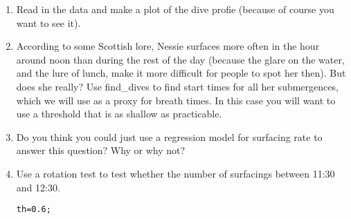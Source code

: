 \documentclass[12pt]{article}\usepackage[]{graphicx}\usepackage[]{color}
\makeatletter
\newcommand{\hlnum}[1]{\textcolor[rgb]{0.686,0.059,0.569}{#1}}%
\newcommand{\hlstd}[1]{\textcolor[rgb]{0.345,0.345,0.345}{#1}}%
\newcommand{\hlkwb}[1]{\textcolor[rgb]{0.69,0.353,0.396}{#1}}%
\newenvironment{kframe}{%
 \def\at@end@of@kframe{}%
 \ifinner\ifhmode%
  \def\at@end@of@kframe{\end{minipage}}%
  \begin{minipage}{\columnwidth}%
 \fi\fi%
 \def\FrameCommand##1{\hskip\@totalleftmargin \hskip-\fboxsep
 \colorbox{shadecolor}{##1}\hskip-\fboxsep
     \hskip-\linewidth \hskip-\@totalleftmargin \hskip\columnwidth}%
 \MakeFramed {\advance\hsize-\width
   \@totalleftmargin\z@ \linewidth\hsize
   \@setminipage}}%
 {\par\unskip\endMakeFramed%
 \at@end@of@kframe}
\newenvironment{knitrout}{}{} %
\makeatother
\begin{document}
\begin{enumerate}
\item Read in the data and make a plot of the dive profie (because of course you want to see it).
\item According to some Scottish lore, Nessie surfaces more often in the hour around noon than during the rest of the day (because the glare on the water, and the lure of lunch, make it more difficult for people to spot her then). But does she really?  Use find\_dives to find start times for all her submergences, which we will use as a proxy for breath times. In this case you will want to use a threshold that is as shallow as practicable.

\item Do you think you could just use a regression model for surfacing rate to answer this question? Why or why not?

\item Use a rotation test to test whether the number of surfacings between 11:30 and 12:30.

\begin{knitrout}
\color{fgcolor}\begin{kframe}
\begin{alltt}
\hlstd{th} \hlkwb{=} \hlnum{0.6}\hlstd{;}
\end{alltt}
\end{kframe}
\end{knitrout}


\end{enumerate}
\end{document}
